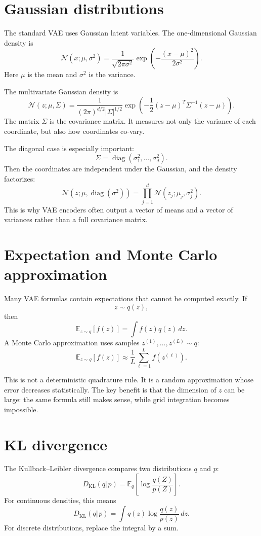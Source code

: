 \section{Gaussian distributions}

The standard VAE uses Gaussian latent variables.  The one-dimensional Gaussian density is
\[
  \mathcal N(x;\mu,\sigma^2)
  =\frac1{\sqrt{2\pi\sigma^2}}
  \exp\left(-\frac{(x-\mu)^2}{2\sigma^2}\right).
\]
Here \(\mu\) is the mean and \(\sigma^2\) is the variance.

The multivariate Gaussian density is
\[
  \mathcal N(z;\mu,\Sigma)
  =\frac{1}{(2\pi)^{d/2}|\Sigma|^{1/2}}
  \exp\left(-\frac12(z-\mu)^T\Sigma^{-1}(z-\mu)\right).
\]
The matrix \(\Sigma\) is the covariance matrix.  It measures not only the variance of each coordinate, but also how coordinates co-vary.

The diagonal case is especially important:
\[
  \Sigma=\operatorname{diag}(\sigma_1^2,\ldots,\sigma_d^2).
\]
Then the coordinates are independent under the Gaussian, and the density factorizes:
\[
  \mathcal N(z;\mu,\operatorname{diag}(\sigma^2))
  =\prod_{j=1}^d \mathcal N(z_j;\mu_j,\sigma_j^2).
\]
This is why VAE encoders often output a vector of means and a vector of variances rather than a full covariance matrix.

\section{Expectation and Monte Carlo approximation}

Many VAE formulas contain expectations that cannot be computed exactly.  If
\[
  z\sim q(z),
\]
then
\[
  \mathbb E_{z\sim q}[f(z)]
  =\int f(z)q(z)\,dz.
\]
A Monte Carlo approximation uses samples \(z^{(1)},\ldots,z^{(L)}\sim q\):
\[
  \mathbb E_{z\sim q}[f(z)]
  \approx \frac1L\sum_{\ell=1}^L f(z^{(\ell)}).
\]

This is not a deterministic quadrature rule.  It is a random approximation whose error decreases statistically.  The key benefit is that the dimension of \(z\) can be large: the same formula still makes sense, while grid integration becomes impossible.

\section{KL divergence}

The Kullback--Leibler divergence compares two distributions \(q\) and \(p\):
\[
  D_{\mathrm{KL}}(q\Vert p)
  =\mathbb E_q\left[\log\frac{q(Z)}{p(Z)}\right].
\]
For continuous densities, this means
\[
  D_{\mathrm{KL}}(q\Vert p)
  =\int q(z)\log\frac{q(z)}{p(z)}\,dz.
\]
For discrete distributions, replace the integral by a sum.

